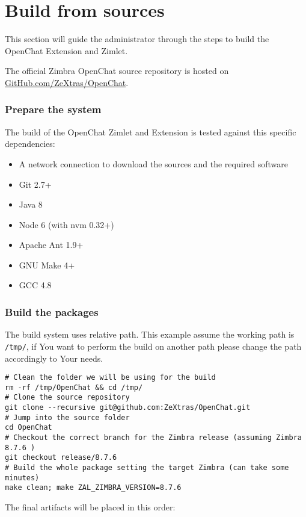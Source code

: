 \section{Build from sources}
\label{sect:buildfromsrcs}

This section will guide the administrator through the steps to build the OpenChat Extension and Zimlet.

The official Zimbra OpenChat source repository is hosted on \href{https://www.github.com/ZeXtras/OpenChat}{GitHub.com/ZeXtras/OpenChat}.

\subsubsection{Prepare the system}
    The build of the OpenChat Zimlet and Extension is tested against this specific dependencies:
    \begin{itemize}
        \item A network connection to download the sources and the required software
        \item Git 2.7+
        \item Java 8
        \item Node 6 (with nvm 0.32+)
        \item Apache Ant 1.9+
        \item GNU Make 4+
        \item GCC 4.8
    \end{itemize}

\subsubsection{Build the packages}
    The build system uses relative path.
    This example assume the working path is \verb+/tmp/+, if You want to perform the build on another path please change
    the path accordingly to Your needs.
    \begin{verbatim}
# Clean the folder we will be using for the build
rm -rf /tmp/OpenChat && cd /tmp/
# Clone the source repository
git clone --recursive git@github.com:ZeXtras/OpenChat.git
# Jump into the source folder
cd OpenChat
# Checkout the correct branch for the Zimbra release (assuming Zimbra 8.7.6 )
git checkout release/8.7.6
# Build the whole package setting the target Zimbra (can take some minutes)
make clean; make ZAL_ZIMBRA_VERSION=8.7.6
    \end{verbatim}

    The final artifacts will be placed in this order:

